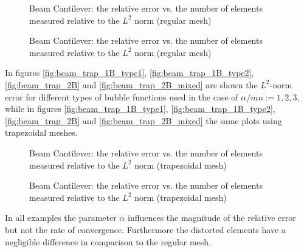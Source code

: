 \documentclass[preprint,12pt,authoryear]{elsarticle}
\begin{document}
\begin{figure}[h!]
\begin{center}
\caption{Beam Cantilever: the relative error vs. the number of elements measured relative to the $L^{2}$ norm (regular mesh)}
\end{center}
\end{figure}
%
\begin{figure}[h!]
\begin{center}
\caption{Beam Cantilever: the relative error vs. the number of elements measured relative to the $L^{2}$ norm (regular mesh)} 
\end{center}
\end{figure}
In figures \ref{fig:beam_trap_1B_type1}, \ref{fig:beam_trap_1B_type2}, \ref{fig:beam_trap_2B} and \ref{fig:beam_trap_2B_mixed} are shown the $L^{2}$-norm error for different types of bubble functions used in the case of $\alpha/mu:={1,2,3}$, while in figures \ref{fig:beam_trap_1B_type1}, \ref{fig:beam_trap_1B_type2}, \ref{fig:beam_trap_2B} and \ref{fig:beam_trap_2B_mixed} the same plots using trapezoidal meshes.
\begin{figure}[h!]
\begin{center}
\caption{Beam Cantilever: the relative error vs. the number of elements measured relative to the $L^{2}$ norm (trapezoidal mesh)}
\end{center}
\end{figure}
%
\begin{figure}[h!]
\begin{center}
\caption{Beam Cantilever: the relative error vs. the number of elements measured relative to the $L^{2}$ norm (trapezoidal mesh)}
\end{center}
\end{figure}
In all examples the parameter $\alpha$ influences the magnitude of the relative error but not the rate of convergence. Furthermore the distorted elements have a negligible difference in comparison to the regular mesh.  
\end{document}
